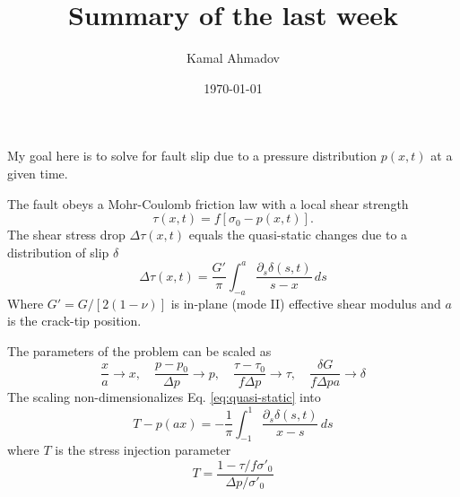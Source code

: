 \documentclass[12pt]{article}
\begin{document}
\title{Summary of the last week}
\author{Kamal Ahmadov}
\date{\today}
\maketitle

My goal here is to solve for fault slip due to a pressure distribution $p(x,t)$
at a given time.

The fault obeys a Mohr-Coulomb friction law with a local shear strength
$$
	\tau(x,t) = f[\sigma_{0} - p(x,t)].
$$
The shear stress drop $\Delta \tau(x,t)$ equals the quasi-static changes due to a distribution of slip $\delta$
\begin{equation}\label{eq:quasi-static}
	\Delta \tau(x,t) = \frac{G'}{\pi} \int_{-a}^{a} \frac{\partial_{s}
		\delta(s,t)}{s - x}   \, ds
\end{equation}
Where $G'=G/[2(1-\nu)]$ is in-plane (mode II) effective shear modulus and $a$ is
the crack-tip position.

The parameters of the problem can be scaled as
$$
	\frac{x}{a} \to x, \quad  \frac{p - p_{0}}{\Delta p} \to p,\quad \frac{\tau -
		\tau_{0}}{f \Delta p} \to \tau, \quad \frac{\delta G}{f \Delta p a} \to \delta
$$
The scaling non-dimensionalizes Eq. \ref{eq:quasi-static} into
\begin{equation}\label{eq:dimless-quasi-static}
	T - p(ax) = - \frac{1}{\pi} \int_{-1}^{1} \frac{\partial_{s} \delta(s, t)}{x - s}
	\, ds
\end{equation}
where $T$ is the stress injection parameter
$$
	T = \frac{1 - \tau/f \sigma'_{0}}{\Delta p / \sigma'_{0}}
$$

\printbibliography
\end{document}
